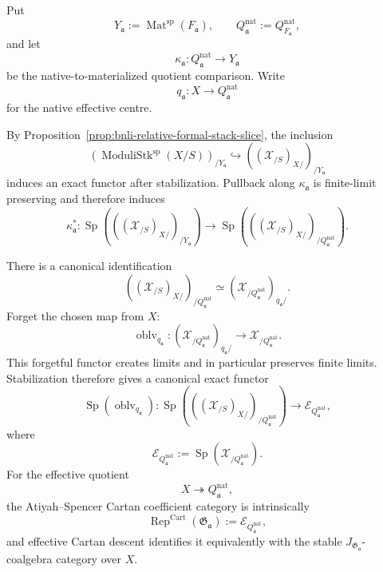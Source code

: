 \begin{construction}
\label{def:bnli-rep-materialization}
Put
\[
    Y_{\mathfrak a}
    :=
    \operatorname{Mat}^{\mathrm{sp}}(F_{\mathfrak a}),
    \qquad
    Q_{\mathfrak a}^{\mathrm{nat}}
    :=
    Q^{\mathrm{nat}}_{F_{\mathfrak a}},
\]
and let
\[
    \kappa_{\mathfrak a}:
    Q_{\mathfrak a}^{\mathrm{nat}}
    \longrightarrow
    Y_{\mathfrak a}
\]
be the native-to-materialized quotient comparison.  Write
\[
    q_{\mathfrak a}:
    X\longrightarrow Q_{\mathfrak a}^{\mathrm{nat}}
\]
for the native effective centre.

By Proposition~\ref{prop:bnli-relative-formal-stack-slice}, the inclusion
\[
    \left(
      \operatorname{ModuliStk}^{\mathrm{sp}}(X/S)
    \right)_{/Y_{\mathfrak a}}
    \hookrightarrow
    \left(
      (\mathcal X_{/S})_{X/}
    \right)_{/Y_{\mathfrak a}}
\]
induces an exact functor after stabilization.  Pullback along
$\kappa_{\mathfrak a}$ is finite-limit preserving and therefore induces
\[
    \kappa_{\mathfrak a}^*:
    \operatorname{Sp}
    \left(
      \left(
        (\mathcal X_{/S})_{X/}
      \right)_{/Y_{\mathfrak a}}
    \right)
    \longrightarrow
    \operatorname{Sp}
    \left(
      \left(
        (\mathcal X_{/S})_{X/}
      \right)_{/Q_{\mathfrak a}^{\mathrm{nat}}}
    \right).
\]

There is a canonical identification
\[
    \left(
      (\mathcal X_{/S})_{X/}
    \right)_{/Q_{\mathfrak a}^{\mathrm{nat}}}
    \simeq
    \left(
      \mathcal X_{/Q_{\mathfrak a}^{\mathrm{nat}}}
    \right)_{q_{\mathfrak a}/}.
\]
Forget the chosen map from $X$:
\[
    \operatorname{oblv}_{q_{\mathfrak a}}:
    \left(
      \mathcal X_{/Q_{\mathfrak a}^{\mathrm{nat}}}
    \right)_{q_{\mathfrak a}/}
    \longrightarrow
    \mathcal X_{/Q_{\mathfrak a}^{\mathrm{nat}}}.
\]
This forgetful functor creates limits and in particular preserves finite
limits.  Stabilization therefore gives a canonical exact functor
\[
\boxed{
    \operatorname{Sp}(\operatorname{oblv}_{q_{\mathfrak a}}):
    \operatorname{Sp}
    \left(
      \left(
        (\mathcal X_{/S})_{X/}
      \right)_{/Q_{\mathfrak a}^{\mathrm{nat}}}
    \right)
    \longrightarrow
    \mathcal E_{Q_{\mathfrak a}^{\mathrm{nat}}},}
\]
where
\[
    \mathcal E_{Q_{\mathfrak a}^{\mathrm{nat}}}
    :=
    \operatorname{Sp}
    \left(
      \mathcal X_{/Q_{\mathfrak a}^{\mathrm{nat}}}
    \right).
\]
For the effective quotient
\[
    X\twoheadrightarrow Q_{\mathfrak a}^{\mathrm{nat}},
\]
the Atiyah--Spencer Cartan coefficient category is intrinsically
\[
    \operatorname{Rep}^{\mathrm{Cart}}(\mathfrak G_{\mathfrak a})
    :=
    \mathcal E_{Q_{\mathfrak a}^{\mathrm{nat}}},
\]
and effective Cartan descent identifies it equivalently with the stable
$J_{\mathfrak G_{\mathfrak a}}$-coalgebra category over $X$.


\end{construction}
